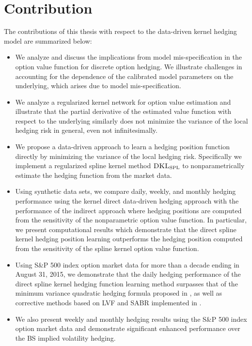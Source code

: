 \documentclass[letterpaper,12pt,titlepage,oneside,final]{book}
\numberwithin{equation}{section}
\theoremstyle{definition}
\newcommand{\DKLs}{\bf\textsc{DKL}_{\text{SPL}}}
\begin{document}
\section{Contribution}
The contributions of this thesis with respect to the data-driven kernel hedging model \cite{knian2017} are summarized below:
\begin{itemize}
\item We analyze and discuss the implications from model mis-specification in the option value function for discrete option hedging. We illustrate challenges in accounting for the dependence of the calibrated model parameters on the underlying, which arises due to  model mis-specification.

\item We analyze a regularized kernel network for option value estimation and illustrate that  the partial derivative of the estimated value function with respect to the underlying similarly does not minimize the variance of the local hedging risk in general, even not infinitesimally.

\item We propose a data-driven approach to learn a hedging position function directly by minimizing the variance of the local hedging  risk.
    Specifically we implement a regularized spline kernel method $\DKLs$ to nonparametrically estimate the hedging function from the market data.

\item Using synthetic data sets, we compare daily, weekly, and monthly hedging performance using
   the kernel direct data-driven hedging approach with the performance of the indirect approach where hedging positions are computed from the sensitivity of the nonparametric option value function. In particular, we present computational results which demonstrate that the direct spline kernel hedging position learning outperforms the hedging position computed from the sensitivity of the spline kernel option value function.

\item Using  S\&P 500 index option market data for more than a decade ending in August 31, 2015, we demonstrate that the  daily hedging performance of the direct spline kernel hedging function learning method   surpasses that of the   minimum variance quadratic hedging formula proposed in \citep{hulloptimal},  as well as corrective methods based on LVF and SABR implemented in  \citep{hulloptimal}.

\item We also present weekly and monthly hedging results using the  S\&P 500 index option market data and demonstrate significant enhanced performance over the BS implied volatility hedging.
\end{itemize}
\end{document}
